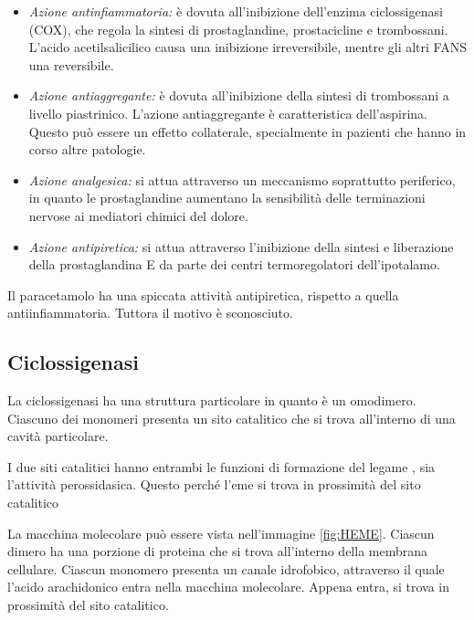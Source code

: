 \begin{itemize}
\item
\emph{Azione antinfiammatoria:} è dovuta all'inibizione dell'enzima
ciclossigenasi (COX), che regola la sintesi di prostaglandine,
prostacicline e trombossani. L'acido acetilsalicilico causa una
inibizione irreversibile, mentre gli altri FANS una reversibile.
\item
\emph{Azione antiaggregante:} è dovuta all'inibizione della sintesi di
trombossani a livello piastrinico. L'azione antiaggregante è
caratteristica dell'aspirina. Questo può essere un effetto
collaterale, specialmente in pazienti che hanno in corso altre
patologie.
\item
\emph{Azione analgesica:} si attua attraverso un meccanismo
soprattutto periferico, in quanto le prostaglandine aumentano la
sensibilità delle terminazioni nervose ai mediatori chimici del
dolore.
\item
\emph{Azione antipiretica:} si attua attraverso l'inibizione della
sintesi e liberazione della prostaglandina E da parte dei centri
termoregolatori dell'ipotalamo.
\end{itemize}

Il paracetamolo ha una spiccata attività antipiretica, rispetto a quella
antiinfiammatoria. Tuttora il motivo è sconosciuto.

\subsection{Ciclossigenasi}

La ciclossigenasi ha una struttura particolare in quanto è un omodimero.
Ciascuno dei monomeri presenta un sito catalitico che si trova
all'interno di una cavità particolare.


I due siti catalitici hanno entrambi le funzioni di formazione del
legame , sia l'attività perossidasica. Questo perché l'eme si
trova in prossimità del sito catalitico


La macchina molecolare può essere vista nell'immagine \ref{fig:HEME}. Ciascun
dimero ha una porzione di proteina che si trova all'interno della
membrana cellulare. Ciascun monomero presenta un canale idrofobico,
attraverso il quale l'acido arachidonico entra nella macchina
molecolare. Appena entra, si trova in prossimità del sito catalitico.

